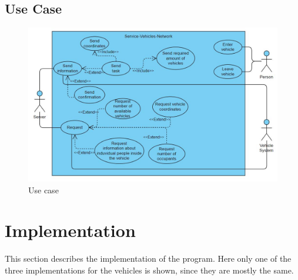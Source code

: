 \subsection{Use Case}
\begin{figure}[!h]
\includegraphics[scale=0.5]{images/Heiber/b0.JPG}
\caption[caption]{Use case}
\end{figure}

\section{Implementation}
\label{sec:4}
This section describes the implementation of the program. Here only one of the three implementations for the vehicles is shown, since they are mostly the same.
